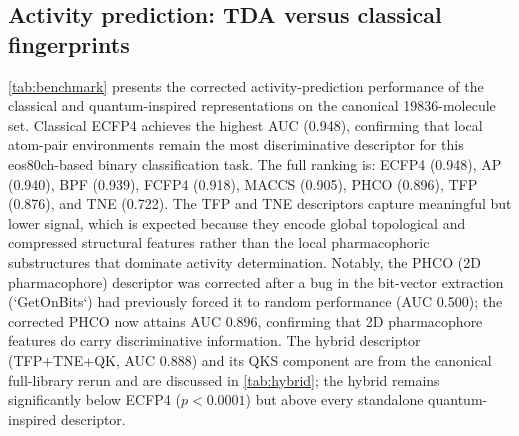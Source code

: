 \documentclass[11pt,a4paper]{article}
\begin{document}
\subsection{Activity prediction: TDA versus classical fingerprints}

\cref{tab:benchmark} presents the corrected activity-prediction performance of the classical and quantum-inspired representations on the canonical \num{19836}-molecule set. Classical ECFP4 achieves the highest AUC (\num{0.948}), confirming that local atom-pair environments remain the most discriminative descriptor for this eos80ch-based binary classification task. The full ranking is: ECFP4 (\num{0.948}), AP (\num{0.940}), BPF (\num{0.939}), FCFP4 (\num{0.918}), MACCS (\num{0.905}), PHCO (\num{0.896}), TFP (\num{0.876}), and TNE (\num{0.722}). The TFP and TNE descriptors capture meaningful but lower signal, which is expected because they encode global topological and compressed structural features rather than the local pharmacophoric substructures that dominate activity determination. Notably, the PHCO (2D pharmacophore) descriptor was corrected after a bug in the bit-vector extraction (`GetOnBits`) had previously forced it to random performance (AUC \num{0.500}); the corrected PHCO now attains AUC \num{0.896}, confirming that 2D pharmacophore features do carry discriminative information. The hybrid descriptor (TFP+TNE+QK, AUC \num{0.888}) and its QKS component are from the canonical full-library rerun and are discussed in \cref{tab:hybrid}; the hybrid remains significantly below ECFP4 ($p < \num{0.0001}$) but above every standalone quantum-inspired descriptor.
\end{document}
